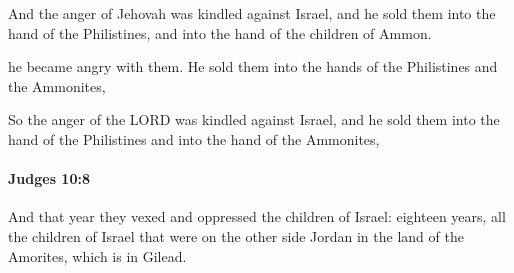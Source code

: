			\begin{versebox}
					\item[BHS] 
					\item[ASV] And the anger of Jehovah was kindled against Israel, and he sold them into the hand of the Philistines, and into the hand of the children of Ammon.
					\item[NIV] he became angry with them. He sold them into the hands of the Philistines and the Ammonites,
					\item[NRSV] So the anger of the LORD was kindled against Israel, and he sold them into the hand of the Philistines and into the hand of the Ammonites,
			\end{versebox}

		\paragraph{Judges 10:8} %
			\label{JUDGES-10-8}

			And that year they vexed and oppressed the children of Israel: eighteen years, all the children of Israel that were on the other side Jordan in the land of the Amorites, which is in Gilead.

